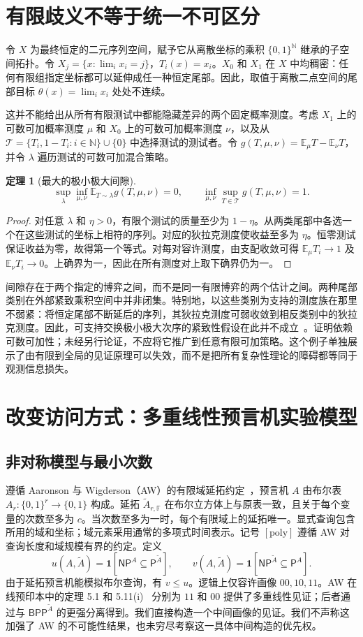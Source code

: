 \documentclass[11pt,a4paper]{article}
\newcommand{\bits}{\{0,1\}}
\newcommand{\PP}{\mathsf{P}}
\newcommand{\NP}{\mathsf{NP}}
\newcommand{\BB}{\mathsf{BPP}}
\newcommand{\Atil}{\widetilde A}
\newcommand{\F}{\mathbb F}
\newtheorem{theorem}{定理}[section]
\begin{document}
\section{有限歧义不等于统一不可区分}
令 $X$ 为最终恒定的二元序列空间，赋予它从离散坐标的乘积 $\bits^{\mathbb N}$ 继承的子空间拓扑。令 $X_j=\{x:\lim_i x_i=j\}$，$T_i(x)=x_i$。$X_0$ 和 $X_1$ 在 $X$ 中均稠密：任何有限组指定坐标都可以延伸成任一种恒定尾部。因此，取值于离散二点空间的尾部目标 $\theta(x)=\lim_i x_i$ 处处不连续。

这并不能给出从所有有限测试中都能隐藏差异的两个固定概率测度。考虑 $X_1$ 上的可数可加概率测度 $\mu$ 和 $X_0$ 上的可数可加概率测度 $\nu$，以及从 $\mathcal T=\{T_i,1-T_i:i\in\mathbb N\}\cup\{0\}$ 中选择测试的测试者。令 $g(T,\mu,\nu)=\mathbb E_\mu T-\mathbb E_\nu T$，并令 $\lambda$ 遍历测试的可数可加混合策略。
\begin{theorem}[最大的极小极大间隙]\label{thm:mm}
\[
\sup_\lambda\inf_{\mu,\nu}\mathbb E_{T\sim\lambda}g(T,\mu,\nu)=0,\qquad
\inf_{\mu,\nu}\sup_{T\in\mathcal T}g(T,\mu,\nu)=1.
\]
\end{theorem}
\begin{proof}
对任意 $\lambda$ 和 $\eta>0$，有限个测试的质量至少为 $1-\eta$。从两类尾部中各选一个在这些测试的坐标上相符的序列。对应的狄拉克测度使收益至多为 $\eta$。恒零测试保证收益为零，故得第一个等式。对每对容许测度，由支配收敛可得 $\mathbb E_\mu T_i\to1$ 及 $\mathbb E_\nu T_i\to0$。上确界为一，因此在所有测度对上取下确界仍为一。
\end{proof}
间隙存在于两个指定的博弈之间，而不是同一有限博弈的两个估计之间。两种尾部类别在外部紧致乘积空间中并非闭集。特别地，以这些类别为支持的测度族在那里不弱紧：将恒定尾部不断延后的序列，其狄拉克测度可弱收敛到相反类别中的狄拉克测度。因此，可支持交换极小极大次序的紧致性假设在此并不成立~\cite{sion}。证明依赖可数可加性；未经另行论证，不应将它推广到任意有限可加策略。这个例子单独展示了由有限到全局的见证原理可以失效，而不是把所有复杂性理论的障碍都等同于观测信息损失。

\section{改变访问方式：多重线性预言机实验模型}
\subsection{非对称模型与最小次数}
遵循 Aaronson 与 Wigderson（AW）的有限域延拓约定~\cite{aw}，预言机 $A$ 由布尔表 $A_r:\bits^r\to\bits$ 构成。延拓 $\Atil_{r,\F}$ 在布尔立方体上与原表一致，且关于每个变量的次数至多为 $c$。当次数至多为一时，每个有限域上的延拓唯一。显式查询包含所用的域和坐标；域元素采用通常的多项式时间表示。记号 $[\mathrm{poly}]$ 遵循 AW 对查询长度和域规模有界的约定。定义
\[
u(A,\Atil)=\mathbf1[\NP^A\subseteq\PP^{\Atil}],\qquad
v(A,\Atil)=\mathbf1[\NP^{\Atil}\subseteq\PP^A].
\]
由于延拓预言机能模拟布尔查询，有 $v\le u$。逻辑上仅容许画像 $00,10,11$。AW 在线预印本中的定理 5.1 和 5.11(i)~\cite{aw} 分别为 $11$ 和 $00$ 提供了多重线性见证；后者通过与 $\BB^{\Atil}$ 的更强分离得到。我们直接构造一个中间画像的见证。我们不声称这加强了 AW 的不可能性结果，也未穷尽考察这一具体中间构造的优先权。
\end{document}
